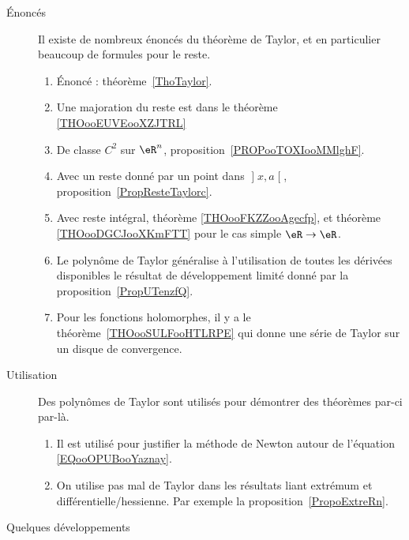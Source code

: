 
\begin{description}
	\item[Énoncés]

		Il existe de nombreux énoncés du théorème de Taylor, et en particulier beaucoup de formules pour le reste.

		\begin{enumerate}
			\item
			      Énoncé : théorème~\ref{ThoTaylor}.
			\item
			      Une majoration du reste est dans le théorème \ref{THOooEUVEooXZJTRL}
			\item
			      De classe \( C^2\) sur \( \eR^n\), proposition~\ref{PROPooTOXIooMMlghF}.
			\item
			      Avec un reste donné par un point dans \( \mathopen] x , a \mathclose[\), proposition~\ref{PropResteTaylorc}.
			\item
			      Avec reste intégral, théorème \ref{THOooFKZZooAgecfp}, et théorème \ref{THOooDGCJooXKmFTT} pour le cas simple \( \eR\to \eR\).
			\item
			      Le polynôme de Taylor généralise à l'utilisation de toutes les dérivées disponibles le résultat de développement limité donné par la proposition~\ref{PropUTenzfQ}.
			\item
			      Pour les fonctions holomorphes, il y a le théorème~\ref{THOooSULFooHTLRPE} qui donne une série de Taylor sur un disque de convergence.
		\end{enumerate}

	\item[Utilisation]

		Des polynômes de Taylor sont utilisés pour démontrer des théorèmes par-ci par-là.

		\begin{enumerate}
			\item
			      Il est utilisé pour justifier la méthode de Newton autour de l'équation \eqref{EQooOPUBooYaznay}.
			\item
			      On utilise pas mal de Taylor dans les résultats liant extrémum et différentielle/hessienne. Par exemple la proposition~\ref{PropoExtreRn}.
		\end{enumerate}

	\item[Quelques développements]


\end{description}
